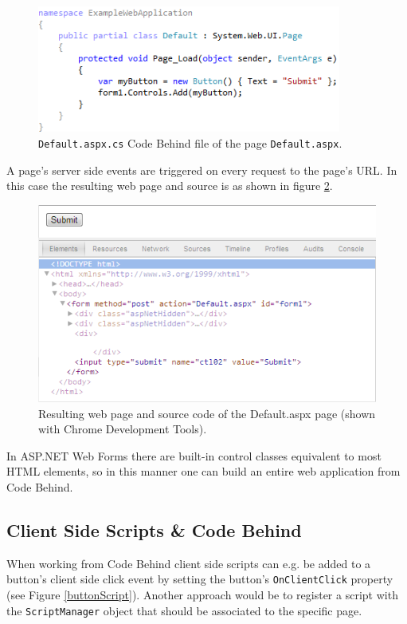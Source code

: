 				\begin{figure}[H]
					\includegraphics[width=10cm]{resources/images/CodeBehind.png}
				\caption{\texttt{Default.aspx.cs} Code Behind file of the page \texttt{Default.aspx}.}
				\label{codeBehind}
			\end{figure}
		
		A page's server side events are triggered on every request to the page's URL. In this case the resulting web page and source is as shown in figure \ref{html}.

				\begin{figure}[H]
					\includegraphics[width=12cm]{resources/images/Html.png}
				\caption{Resulting web page and source code of the Default.aspx page (shown with Chrome Development Tools).}
				\label{html}
			\end{figure}

		In ASP.NET Web Forms there are built-in control classes equivalent to most HTML elements, so in this manner one can build an entire web application from Code Behind.

		\subsection{Client Side Scripts \& Code Behind} %
		\label{sub:client_side_scripts_code_behind}
			When working from Code Behind client side scripts can e.g. be added to a button's client side click event by setting the button's \texttt{OnClientClick} property (see Figure \ref{buttonScript}). Another approach would be to register a script with the \texttt{ScriptManager} object that should be associated to the specific page.

